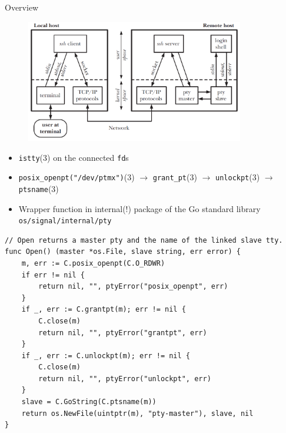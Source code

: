 \documentclass[
	xcolor=dvipsnames,
]{beamer}
\newenvironment{zhawframe}[1][]
{\begin{frame}[environment=fr,#1]{\insertsectionhead}{\insertsubsectionhead}}
{\end{frame}
}
\begin{document}
\begin{zhawframe}
Overview
\begin{figure}[ht]
\includegraphics[width=0.85\textwidth]{PseudoterminalSSH}
\end{figure}
\end{zhawframe}

\begin{zhawframe}
\begin{itemize}
\item<1-> \texttt{istty}(3) on the connected \texttt{fd}s
\item<2-> \texttt{posix\_{}openpt("/dev/ptmx")}(3) $\rightarrow$ \texttt{grant\_{}pt}(3) $\rightarrow$ \texttt{unlockpt}(3) $\rightarrow$ \texttt{ptsname}(3)
\item<3-> Wrapper function in internal(!) package of the Go standard library \texttt{os/signal/internal/pty}
\end{itemize}
\end{zhawframe}

\begin{frame}[fragile]{\insertsectionhead}{\insertsubsectionhead}
\lstset{
	style = basestyle,
	language = Golang,
}
\begin{lstlisting}
// Open returns a master pty and the name of the linked slave tty.
func Open() (master *os.File, slave string, err error) {
    m, err := C.posix_openpt(C.O_RDWR)
    if err != nil {
        return nil, "", ptyError("posix_openpt", err)
    }
    if _, err := C.grantpt(m); err != nil {
        C.close(m)
        return nil, "", ptyError("grantpt", err)
    }
    if _, err := C.unlockpt(m); err != nil {
        C.close(m)
        return nil, "", ptyError("unlockpt", err)
    }
    slave = C.GoString(C.ptsname(m))
    return os.NewFile(uintptr(m), "pty-master"), slave, nil
}
\end{lstlisting}
\end{frame}
\end{document}
